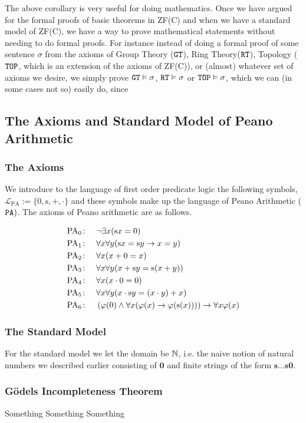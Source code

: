 The above corollary is very useful for doing mathematics. Once we have argued for the formal proofs of basic theorems in ZF(C) and when we have a standard model of ZF(C), we have a way to prove mathematical statements without needing to do formal proofs. For instance instead of doing a formal proof of some sentence $\sigma$ from the axioms of Group Theory ($\verb|GT|$), Ring Theory($\verb|RT|$), Topology ($\verb|TOP|$, which is an extension of the axioms of ZF(C)), or (almost) whatever set of axioms we desire, we simply prove $\verb|GT|\vDash \sigma$, $\verb|RT|\vDash \sigma$ or $\verb|TOP|\vDash \sigma$, which we can (in some cases not so) easily do, since  
\subsection{The Axioms and Standard Model of Peano Arithmetic}

\subsubsection{The Axioms}
We introduce to the language of first order predicate logic the following symbols, $\mathcal{L}_{\mathrm{PA}}:=\{0,\mathrm{s},+,\cdot\}$ and these symbols make up the language of Peano Arithmetic ($\verb|PA|)$. The axioms of Peano arithmetic are as follows. 
    \begin{axioms}
        \begin{align*}
            \mathrm{PA}_0\colon\quad & \neg \exists x (\mathrm{s} x = 0) \\
            \mathrm{PA}_1\colon\quad & \forall x \forall y (\mathrm{s} x = \mathrm{s} y \rightarrow x = y) \\
            \mathrm{PA}_2\colon\quad & \forall x (x + 0 = x) \\
            \mathrm{PA}_3\colon\quad & \forall x \forall y (x + \mathrm{s} y = \mathrm{s}(x + y)) \\
            \mathrm{PA}_4\colon\quad & \forall x (x \cdot 0 = 0) \\
            \mathrm{PA}_5\colon\quad & \forall x \forall y (x \cdot \mathrm{s} y = (x \cdot y) + x) \\
            \mathrm{PA}_6\colon\quad & \left( \varphi(0) \land \forall x (\varphi(x) \rightarrow \varphi(\mathrm{s} (x))) \right) \rightarrow \forall x \varphi(x)
        \end{align*}
    \end{axioms}
\subsubsection{The Standard Model}
For the standard model we let the domain be $\mathbb{N}$, i.e. the naive notion of natural numbers we described earlier consisting of $\mathbf{0}$ and finite strings of the form $\mathbf{s}\dots \mathbf{s}\mathbf{0}$. 


\subsubsection{Gödels Incompleteness Theorem}
Something Something Something 
